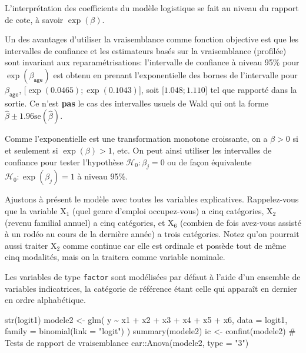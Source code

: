 \documentclass[
  11pt,
  letterpaper,
]{book}
\newenvironment{Shaded}{\begin{snugshade}}{\end{snugshade}}
\newcommand{\AttributeTok}[1]{\textcolor[rgb]{0.40,0.45,0.13}{#1}}
\newcommand{\CommentTok}[1]{\textcolor[rgb]{0.37,0.37,0.37}{#1}}
\newcommand{\FunctionTok}[1]{\textcolor[rgb]{0.28,0.35,0.67}{#1}}
\newcommand{\NormalTok}[1]{\textcolor[rgb]{0.00,0.23,0.31}{#1}}
\newcommand{\OtherTok}[1]{\textcolor[rgb]{0.00,0.23,0.31}{#1}}
\newcommand{\SpecialCharTok}[1]{\textcolor[rgb]{0.37,0.37,0.37}{#1}}
\newcommand{\StringTok}[1]{\textcolor[rgb]{0.13,0.47,0.30}{#1}}
\theoremstyle{definition}
\theoremstyle{remark}
\begin{document}
L'interprétation des coefficients du modèle logistique se fait au niveau
du rapport de cote, à savoir \(\exp(\beta)\).

Un des avantages d'utiliser la vraisemblance comme fonction objective
est que les intervalles de confiance et les estimateurs basés sur la
vraisemblance (profilée) sont invariant aux reparamétrisations:
l'intervalle de confiance à niveau 95\% pour
\(\exp(\beta_{\texttt{age}})\) est obtenu en prenant l'exponentielle des
bornes de l'intervalle pour \(\beta_{\texttt{age}}\),
{[}\(\exp(0.0465); \exp(0.1043)\){]}, soit {[}\(1.048; 1.110\){]} tel
que rapporté dans la sortie. Ce n'est \textbf{pas} le cas des
intervalles usuels de Wald qui ont la forme
\(\widehat{\beta} \pm 1.96 \mathrm{se}(\widehat{\beta})\).

Comme l'exponentielle est une transformation monotone croissante, on a
\(\beta>0\) si et seulement si \(\exp(\beta)>1\), etc. On peut ainsi
utiliser les intervalles de confiance pour tester l'hypothèse
\(\mathscr{H}_0: \beta_j=0\) ou de façon équivalente
\(\mathscr{H}_0: \exp(\beta_j)=1\) à niveau 95\%.

Ajustons à présent le modèle avec toutes les variables explicatives.
Rappelez-vous que la variable \(\mathrm{X}_1\) (quel genre d'emploi
occupez-vous) a cinq catégories, \(\mathrm{X}_2\) (revenu familial
annuel) a cinq catégories, et \(\mathrm{X}_6\) (combien de fois
avez-vous assisté à un rodéo au cours de la dernière année) a trois
catégories. Notez qu'on pourrait aussi traiter \(\mathrm{X}_2\) comme
continue car elle est ordinale et possède tout de même cinq modalités,
mais on la traitera comme variable nominale.

Les variables de type \texttt{factor} sont modélisées par défaut à
l'aide d'un ensemble de variables indicatrices, la catégorie de
référence étant celle qui apparaît en dernier en ordre alphabétique.

\begin{Shaded}
\begin{Highlighting}[]
\FunctionTok{str}\NormalTok{(logit1)}
\NormalTok{modele2 }\OtherTok{\textless{}{-}} \FunctionTok{glm}\NormalTok{(}
\NormalTok{  y }\SpecialCharTok{\textasciitilde{}}\NormalTok{ x1 }\SpecialCharTok{+}\NormalTok{ x2 }\SpecialCharTok{+}\NormalTok{ x3 }\SpecialCharTok{+}\NormalTok{ x4 }\SpecialCharTok{+}\NormalTok{ x5 }\SpecialCharTok{+}\NormalTok{ x6,}
  \AttributeTok{data =}\NormalTok{ logit1,}
  \AttributeTok{family =} \FunctionTok{binomial}\NormalTok{(}\AttributeTok{link =} \StringTok{"logit"}\NormalTok{)}
\NormalTok{)}
\FunctionTok{summary}\NormalTok{(modele2)}
\NormalTok{ic }\OtherTok{\textless{}{-}} \FunctionTok{confint}\NormalTok{(modele2)}
\CommentTok{\# Tests de rapport de vraisemblance}
\NormalTok{car}\SpecialCharTok{::}\FunctionTok{Anova}\NormalTok{(modele2, }\AttributeTok{type =} \StringTok{"3"}\NormalTok{)}
\end{Highlighting}
\end{Shaded}
\end{document}
